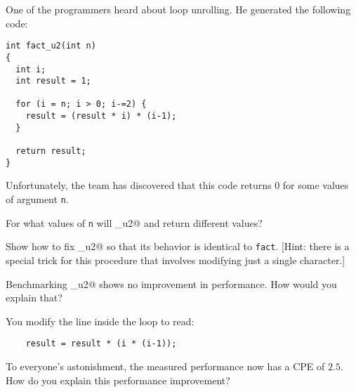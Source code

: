 \begin{problem}{8}

One of the programmers heard about loop unrolling.  He generated the
following code:
\begin{verbatim}
int fact_u2(int n)
{
  int i;
  int result = 1;

  for (i = n; i > 0; i-=2) {
    result = (result * i) * (i-1);
  }

  return result;
}
\end{verbatim}
Unfortunately, the team has discovered that this code
returns 0 for some values of argument {\tt n}.
\begin{choice}
\item
For what values of {\tt n} will \verb@fact_u2@ and \verb@fact@ return
different values?  
\item
Show how to fix \verb@fact_u2@ so that its behavior is identical to
{\tt fact}.  [Hint: there is a special trick for this procedure that
involves modifying just a single character.]
\item
Benchmarking \verb@fact_u2@ shows no improvement in performance.  How
would you explain that?
\item
You modify the line inside the loop to read:
\begin{verbatim}
    result = result * (i * (i-1));
\end{verbatim}
To everyone's astonishment, the
measured performance now has a CPE of $2.5$.  How do you
explain this performance improvement?
\end{choice}

\end{problem}
